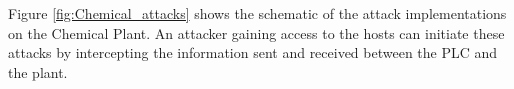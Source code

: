 Figure \ref{fig:Chemical_attacks} shows the schematic of the attack implementations on the Chemical Plant. An attacker gaining access to the hosts can initiate these attacks by intercepting the information sent and received between the PLC and the plant.   

